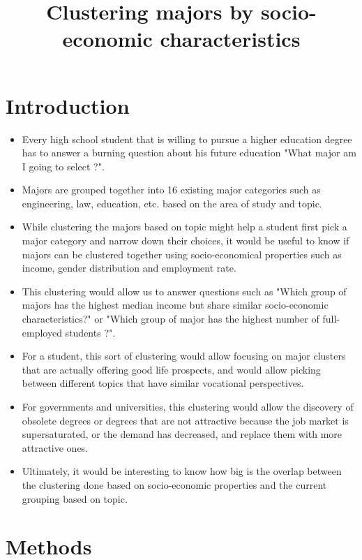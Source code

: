 \documentclass[11pt]{article}
\date{}
\title{Clustering majors by socio-economic characteristics}
\begin{document}
\newpage
\maketitle

\section*{Introduction}

\begin{itemize}[leftmargin=*]
    \item Every high school student that is willing to pursue a higher education degree has to answer a burning question about his future education "What major am I going to select ?".
    \item Majors are grouped together into 16 existing major categories such as engineering, law, education, etc. based on the area of study and topic.
    \item While clustering the majors based on topic might help a student first pick a major category and narrow down their choices, it would be useful to know if majors can be clustered together using socio-economical properties such as income, gender distribution and employment rate.
    \item This clustering  would allow us to answer questions such as "Which group of majors has the highest median income but share similar socio-economic characteristics?" or "Which group of major has the highest number of full-employed students ?".
    \item For a student, this sort of clustering would allow focusing on major clusters that are actually offering good life prospects, and would allow picking between different topics that have similar vocational perspectives.
    \item For governments and universities, this clustering would allow the discovery of obsolete degrees or degrees that are not attractive because the job market is supersaturated, or the demand has decreased, and replace them with more attractive ones.
    \item Ultimately, it would be interesting to know how big is the overlap between the clustering done based on socio-economic properties and the current grouping based on topic. 
\end{itemize}

\section*{Methods}
\end{document}
